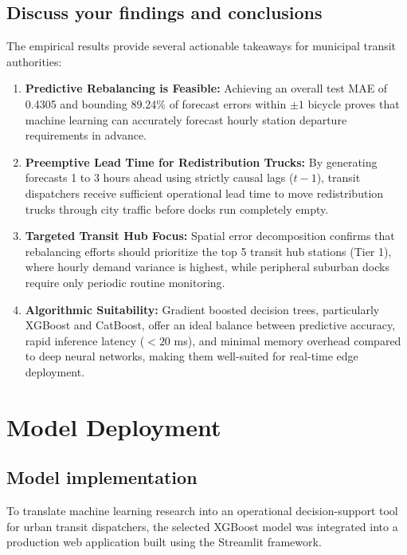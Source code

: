 \documentclass[12pt, a4paper]{article}
\renewcommand{\_}{\textunderscore\allowbreak}
\begin{document}
\subsection{Discuss your findings and conclusions}
The empirical results provide several actionable takeaways for municipal transit authorities:
\begin{enumerate}
    \item \textbf{Predictive Rebalancing is Feasible:} Achieving an overall test MAE of 0.4305 and bounding 89.24\% of forecast errors within $\pm 1$ bicycle proves that machine learning can accurately forecast hourly station departure requirements in advance.
    \item \textbf{Preemptive Lead Time for Redistribution Trucks:} By generating forecasts 1 to 3 hours ahead using strictly causal lags ($t-1$), transit dispatchers receive sufficient operational lead time to move redistribution trucks through city traffic before docks run completely empty.
    \item \textbf{Targeted Transit Hub Focus:} Spatial error decomposition confirms that rebalancing efforts should prioritize the top 5 transit hub stations (Tier 1), where hourly demand variance is highest, while peripheral suburban docks require only periodic routine monitoring.
    \item \textbf{Algorithmic Suitability:} Gradient boosted decision trees, particularly XGBoost and CatBoost, offer an ideal balance between predictive accuracy, rapid inference latency ($< 20$ ms), and minimal memory overhead compared to deep neural networks, making them well-suited for real-time edge deployment.
\end{enumerate}

\clearpage

\section{Model Deployment}

\subsection{Model implementation}
To translate machine learning research into an operational decision-support tool for urban transit dispatchers, the selected XGBoost model was integrated into a production web application built using the Streamlit framework.
\end{document}
